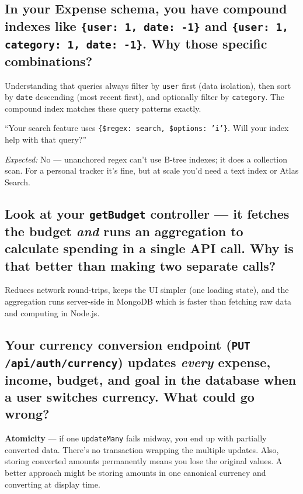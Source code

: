 \documentclass[12pt, a4paper]{article}
\begin{document}
\subsection{In your Expense schema, you have compound indexes like \texttt{\{user: 1, date: -1\}} and \texttt{\{user: 1, category: 1, date: -1\}}. Why those specific combinations?}

\begin{listenfor}
Understanding that queries always filter by \texttt{user} first (data isolation), then sort by \texttt{date} descending (most recent first), and optionally filter by \texttt{category}. The compound index matches these query patterns exactly.
\end{listenfor}

\begin{followup}
``Your search feature uses \texttt{\{\$regex: search, \$options: 'i'\}}. Will your index help with that query?''

\medskip
\emph{Expected:} No — unanchored regex can't use B-tree indexes; it does a collection scan. For a personal tracker it's fine, but at scale you'd need a text index or Atlas Search.
\end{followup}

\subsection{Look at your \texttt{getBudget} controller — it fetches the budget \emph{and} runs an aggregation to calculate spending in a single API call. Why is that better than making two separate calls?}

\begin{listenfor}
Reduces network round-trips, keeps the UI simpler (one loading state), and the aggregation runs server-side in MongoDB which is faster than fetching raw data and computing in Node.js.
\end{listenfor}

\subsection{Your currency conversion endpoint (\texttt{PUT /api/auth/currency}) updates \emph{every} expense, income, budget, and goal in the database when a user switches currency. What could go wrong?}

\begin{listenfor}
\textbf{Atomicity} — if one \texttt{updateMany} fails midway, you end up with partially converted data. There's no transaction wrapping the multiple updates. Also, storing converted amounts permanently means you lose the original values. A better approach might be storing amounts in one canonical currency and converting at display time.
\end{listenfor}
\end{document}
